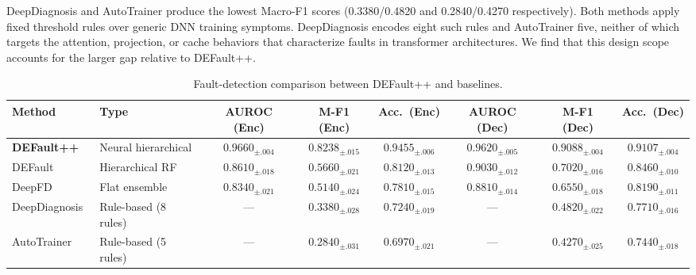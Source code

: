 DeepDiagnosis and AutoTrainer produce the lowest Macro-F1 scores (0.3380/0.4820 and 0.2840/0.4270 respectively).
Both methods apply fixed threshold rules over generic DNN training symptoms.
DeepDiagnosis encodes eight such rules and AutoTrainer five, neither of which targets the attention, projection, or cache behaviors that characterize faults in transformer architectures.
We find that this design scope accounts for the larger gap relative to DEFault++.

\begin{table}[!htbp]
\centering
\caption{Fault-detection comparison between DEFault++ and baselines.}
\label{tab:rq1_detection_comparison}
\footnotesize
\begin{adjustbox}{max width=\textwidth}
\begin{tabular}{l l c c c c c c}
\toprule
\textbf{Method} & \textbf{Type} & \textbf{AUROC (Enc)} & \textbf{M-F1 (Enc)} & \textbf{Acc.\ (Enc)} & \textbf{AUROC (Dec)} & \textbf{M-F1 (Dec)} & \textbf{Acc.\ (Dec)} \\
\midrule
\textbf{DEFault++} & Neural hierarchical & $\mathbf{0.9660}_{\pm .004}$ & $\mathbf{0.8238}_{\pm .015}$ & $\mathbf{0.9455}_{\pm .006}$ & $\mathbf{0.9620}_{\pm .005}$ & $\mathbf{0.9088}_{\pm .004}$ & $\mathbf{0.9107}_{\pm .004}$ \\
DEFault~\cite{default} & Hierarchical RF & $0.8610_{\pm .018}$ & $0.5660_{\pm .021}$ & $0.8120_{\pm .013}$ & $0.9030_{\pm .012}$ & $0.7020_{\pm .016}$ & $0.8460_{\pm .010}$ \\
DeepFD~\cite{deepfd} & Flat ensemble & $0.8340_{\pm .021}$ & $0.5140_{\pm .024}$ & $0.7810_{\pm .015}$ & $0.8810_{\pm .014}$ & $0.6550_{\pm .018}$ & $0.8190_{\pm .011}$ \\
DeepDiagnosis~\cite{deepdiagnosis} & Rule-based (8 rules) & --- & $0.3380_{\pm .028}$ & $0.7240_{\pm .019}$ & --- & $0.4820_{\pm .022}$ & $0.7710_{\pm .016}$ \\
AutoTrainer~\cite{autotrainer} & Rule-based (5 rules) & --- & $0.2840_{\pm .031}$ & $0.6970_{\pm .021}$ & --- & $0.4270_{\pm .025}$ & $0.7440_{\pm .018}$ \\
\bottomrule
\end{tabular}
\end{adjustbox}

\smallskip
{}
\end{table}

